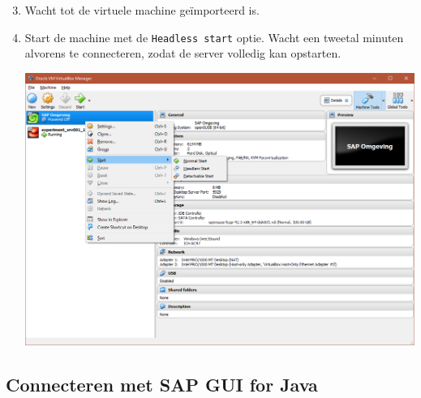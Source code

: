 \documentclass[a4paper, 11pt]{article}
\providecommand{\tightlist}{%
    \setlength{\itemsep}{0pt}
    \setlength{\parskip}{0pt}
}
\begin{document}
\begin{enumerate}
\setcounter{enumi}{2}
\tightlist
\item
  Wacht tot de virtuele machine geïmporteerd is.
\item
  Start de machine met de \texttt{Headless\ start} optie. Wacht een tweetal minuten alvorens te connecteren, zodat de server volledig kan opstarten.
  \begin{center}
    \includegraphics[scale=0.55,center]{img/start.png}
  \end{center}
\end{enumerate}

\subsection{Connecteren met SAP GUI for Java}
\end{document}
